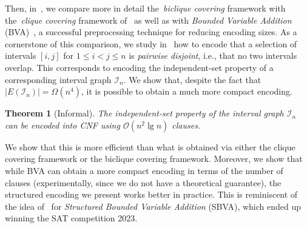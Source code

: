\documentclass[11pt]{article}
\newtheorem{theorem}{Theorem}
\renewcommand{\O}{\mathcal{O}}
\begin{document}
Then, in~, we compare more in detail the~\emph{biclique covering} framework with the~\emph{clique covering} framework of~\citet{ignatievCardinalityEncodingsGraph2017} as well as with \emph{Bounded Variable Addition} (BVA)~\citep{mantheyAutomatedReencodingBoolean2012}, a successful preprocessing technique for reducing encoding sizes.
As a cornerstone of this comparison, we study in~ how to encode that a selection of intervals $[i,  j]$ for $1 \leq i < j \leq n$ is \emph{pairwise disjoint}, i.e., that no two intervals overlap. This corresponds to encoding the independent-set property of a corresponding interval graph $\mathcal{I}_n$. We show that, despite the fact that $|E(\mathcal{I}_n)| = \Omega(n^4)$, it is possible to obtain a much more compact encoding.

\begin{theorem}[Informal]\label{thm:intervals}
    The independent-set property of the interval graph $\mathcal{I}_n$ can be encoded into CNF using $\O(n^2 \lg n)$ clauses.
\end{theorem}

We show that this is more efficient than what is obtained via either the clique covering framework or the biclique covering framework. Moreover, we show that while BVA can obtain a more compact encoding in terms of the number of clauses (experimentally, since we do not have a theoretical guarantee), the structured encoding we present works better in practice. This is reminiscent of the idea of~\citet{haberlandtEffectiveAuxiliaryVariables2023} for \emph{Structured Bounded Variable Addition} (SBVA), which ended up winning the SAT competition 2023.
\end{document}
